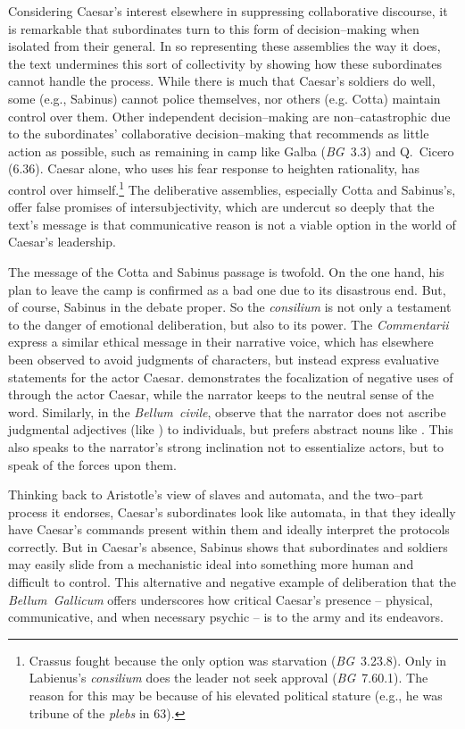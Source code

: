 \documentclass[12pt,letterpaper,oneside,final]{memoir}
\begin{document}
Considering Caesar's interest elsewhere in suppressing collaborative discourse, it is remarkable that subordinates turn to this form of decision--making when isolated from their general. In so representing these assemblies the way it does, the text undermines this sort of collectivity by showing how these subordinates cannot handle the process. While there is much that Caesar's soldiers do well, some (e.g., Sabinus) cannot police themselves, nor others (e.g. Cotta) maintain control over them. Other independent decision--making are non--catastrophic due to the subordinates' collaborative decision--making that recommends as little action as possible, such as remaining in camp like Galba (\emph{BG}~3.3) and Q.~Cicero (6.36). Caesar alone, who uses his fear response to heighten rationality, has control over himself.\footnote{Crassus fought because the only option was starvation (\emph{BG}~3.23.8). Only in Labienus's \emph{consilium} does the leader not seek approval (\emph{BG}~7.60.1). The reason for this may be because of his elevated political stature (e.g., he was tribune of the \emph{plebs} in 63).} The deliberative assemblies, especially Cotta and Sabinus's, offer false promises of intersubjectivity, which are undercut so deeply that the text's message is that communicative reason is not a viable option in the world of Caesar's leadership.

The message of the Cotta and Sabinus passage is twofold. On the one hand, his plan to leave the camp is confirmed as a bad one due to its disastrous end. But, of course, Sabinus  in the debate proper. So the \emph{consilium} is not only a testament to the danger of emotional deliberation, but also to its power. The \emph{Commentarii} express a similar ethical message in their narrative voice, which has elsewhere been observed to avoid judgments of characters, but instead express evaluative statements for the actor Caesar. \textcite[150--155]{riggsby2006} demonstrates the focalization of negative uses of  through the actor Caesar, while the narrator keeps to the neutral sense of the word. Similarly, in the \emph{Bellum~civile}, \textcite[pp.~148--154 and 154--156]{batstonedamon2006} observe that the narrator does not ascribe judgmental adjectives (like ) to individuals, but prefers abstract nouns like . This also speaks to the narrator's strong inclination not to essentialize actors, but to speak of the forces upon them. 

Thinking back to Aristotle's view of slaves and automata, and the two--part process it endorses, Caesar's subordinates look like automata, in that they ideally have Caesar's commands present within them and ideally interpret the protocols correctly. But in Caesar's absence, Sabinus shows that subordinates and soldiers may easily slide from a mechanistic ideal into something more human and difficult to control. This alternative and negative example of deliberation that the \emph{Bellum~Gallicum} offers underscores how critical Caesar's presence -- physical, communicative, and when necessary psychic -- is to the army and its endeavors.
\end{document}
